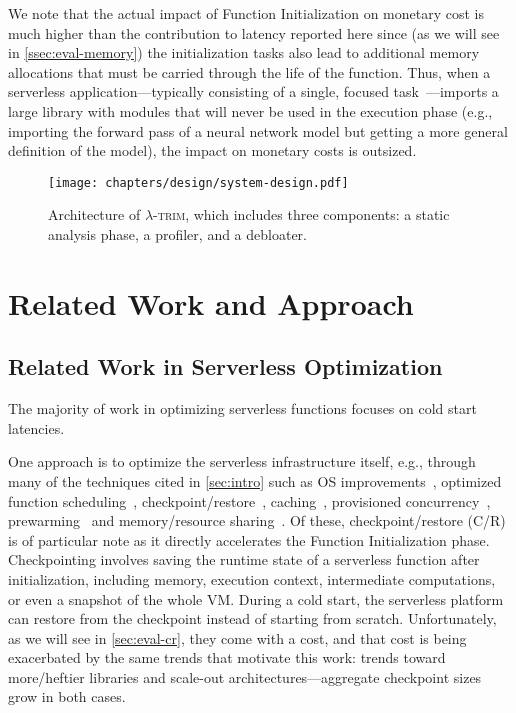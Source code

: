 \documentclass[sigplan,screen]{acmart}
\newcommand{\sys}{\textsc{\ensuremath{\lambda}-trim}\xspace}
\begin{document}
We note that the actual impact of Function Initialization on monetary cost is much higher than the contribution to latency reported here since (as we will see in \cref{ssec:eval-memory}) the initialization tasks also lead to additional memory allocations that must be carried through the life of the function.
Thus, when a serverless application---typically consisting of a single, focused task~\cite{serverless-app-dev2021}---imports a large library with modules that will never be used in the execution phase (e.g., importing the forward pass of a neural network model but getting a more general definition of the model), the impact on monetary costs is outsized.

\begin{figure}[t]
  \centering
\texttt{[image: chapters/design/system-design.pdf]}
  \caption{Architecture of \sys, which includes three components: a static analysis phase, a profiler, and a debloater.}
  \label{fig:system-design}
\end{figure}





 
  
\section{Related Work and Approach}

\subsection{Related Work in Serverless Optimization}
\label{sec:related-coldstarts}



The majority of work in optimizing serverless functions focuses on cold start latencies.

One approach is to optimize the serverless infrastructure itself, e.g., through many of the techniques cited in \cref{sec:intro} such as OS improvements~\cite{firecracker2020, catalyzer2020, faasnap2022}, optimized function scheduling~\cite{caerus2021, LCS2023, wild2020, sustainableServerless24,kraken2021}, checkpoint/restore~\cite{catalyzer2020, prebaking2020}, caching~\cite{faascache2021,SCache23,rainbowcake, containerLoading2023}, provisioned concurrency~\cite{provisionedConcurrency}, prewarming~\cite{icebreaker22,wild2020} and memory/resource sharing~\cite{medes22, tetris2022, containerSharing2022}.
Of these, checkpoint/restore (C/R) is of particular note as it directly accelerates the Function Initialization phase.
Checkpointing involves saving the runtime state of a serverless function after initialization, including memory, execution context, intermediate computations, or even a snapshot of the whole VM. 
During a cold start, the serverless platform can restore from the checkpoint instead of starting from scratch.
Unfortunately, as we will see in \cref{sec:eval-cr}, they come with a cost, and that cost is being exacerbated by the same trends that motivate this work: trends toward more/heftier libraries and scale-out architectures---aggregate checkpoint sizes grow in both cases.
\end{document}
